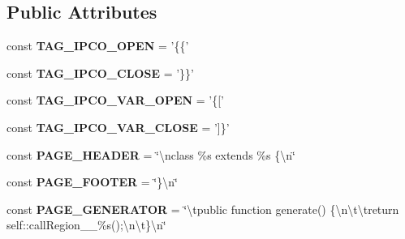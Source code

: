 \subsection*{Public Attributes}
\begin{DoxyCompactItemize}
\item 
\hypertarget{class_i_p_c_o___parser_settings_a2f83a73350a131db88639a2ade4485cb}{const {\bfseries T\-A\-G\-\_\-\-I\-P\-C\-O\-\_\-\-O\-P\-E\-N} = '\{\{'}\label{class_i_p_c_o___parser_settings_a2f83a73350a131db88639a2ade4485cb}

\item 
\hypertarget{class_i_p_c_o___parser_settings_a96db85b7059cbbd46f01e977eec08ced}{const {\bfseries T\-A\-G\-\_\-\-I\-P\-C\-O\-\_\-\-C\-L\-O\-S\-E} = '\}\}'}\label{class_i_p_c_o___parser_settings_a96db85b7059cbbd46f01e977eec08ced}

\item 
\hypertarget{class_i_p_c_o___parser_settings_a79675ec2ca9762bb54edbcc153bee327}{const {\bfseries T\-A\-G\-\_\-\-I\-P\-C\-O\-\_\-\-V\-A\-R\-\_\-\-O\-P\-E\-N} = '\{\mbox{[}'}\label{class_i_p_c_o___parser_settings_a79675ec2ca9762bb54edbcc153bee327}

\item 
\hypertarget{class_i_p_c_o___parser_settings_ad3e81b0656e85dacf5d0b1d3ca976ca1}{const {\bfseries T\-A\-G\-\_\-\-I\-P\-C\-O\-\_\-\-V\-A\-R\-\_\-\-C\-L\-O\-S\-E} = '\mbox{]}\}'}\label{class_i_p_c_o___parser_settings_ad3e81b0656e85dacf5d0b1d3ca976ca1}

\item 
\hypertarget{class_i_p_c_o___parser_settings_aa60a652bf4d6a7f96a3c2582e8a4283a}{const {\bfseries P\-A\-G\-E\-\_\-\-H\-E\-A\-D\-E\-R} = \char`\"{}\textbackslash{}nclass \%s extends \%s \{\textbackslash{}n\char`\"{}}\label{class_i_p_c_o___parser_settings_aa60a652bf4d6a7f96a3c2582e8a4283a}

\item 
\hypertarget{class_i_p_c_o___parser_settings_aa08a7db318bf66bc09dbbb647c98de5d}{const {\bfseries P\-A\-G\-E\-\_\-\-F\-O\-O\-T\-E\-R} = \char`\"{}\}\textbackslash{}n\char`\"{}}\label{class_i_p_c_o___parser_settings_aa08a7db318bf66bc09dbbb647c98de5d}

\item 
\hypertarget{class_i_p_c_o___parser_settings_a9c3c5bb87737120c85e9d47b990cd2ed}{const {\bfseries P\-A\-G\-E\-\_\-\-G\-E\-N\-E\-R\-A\-T\-O\-R} = \char`\"{}\textbackslash{}tpublic function generate() \{\textbackslash{}n\textbackslash{}t\textbackslash{}treturn self\-::call\-Region\-\_\-\-\_\-\%s();\textbackslash{}n\textbackslash{}t\}\textbackslash{}n\char`\"{}}\label{class_i_p_c_o___parser_settings_a9c3c5bb87737120c85e9d47b990cd2ed}


\end{DoxyCompactItemize}
